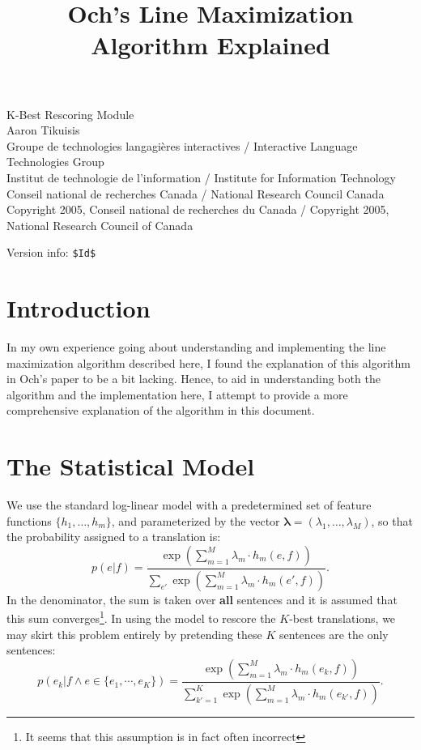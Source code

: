 \documentclass[12pt]{amsart}
\begin{document}
\title{Och's Line Maximization Algorithm Explained}
\maketitle

{\tiny
\noindent
K-Best Rescoring Module\\
Aaron Tikuisis\\
Groupe de technologies langagi{\`e}res interactives / Interactive Language Technologies Group\\
Institut de technologie de l'information / Institute for Information Technology\\
Conseil national de recherches Canada / National Research Council Canada\\
Copyright 2005, Conseil national de recherches du Canada / Copyright 2005, National Research Council of Canada
}

{\tiny
\noindent
Version info: \verb+$Id$+
}
\\

\section{Introduction\label{sec:intro}}
In my own experience going about understanding and implementing the line maximization algorithm described here, I found the explanation of this algorithm in Och's paper to be a bit lacking.
Hence, to aid in understanding both the algorithm and the implementation here, I attempt to provide a more comprehensive explanation of the algorithm in this document.

\section{The Statistical Model\label{sec:model}}
We use the standard log-linear model with a predetermined set of feature functions $\{h_1, \dots , h_m\}$, and parameterized by the vector $\boldsymbol{\lambda} = (\lambda_1, \dots , \lambda_M)$, so that the probability assigned to a translation is:
\[ p(e|f) = \frac
{\exp \left( \sum_{m=1}^M \lambda_m \cdot h_m(e,f) \right)}
{\sum_{e'} \exp \left( \sum_{m=1}^M \lambda_m \cdot h_m(e',f) \right)}. \]
In the denominator, the sum is taken over \textbf{all} sentences and it is assumed that this sum converges\footnote{It seems that this assumption is in fact often incorrect}.
In using the model to rescore the $K$-best translations, we may skirt this problem entirely by pretending these $K$ sentences are the only sentences:
\[ p(e_k|f \land e \in \{e_1, \cdots , e_K\}) = \frac
{\exp \left( \sum_{m=1}^M \lambda_m \cdot h_m(e_k,f) \right)}
{\sum_{k'=1}^K \exp \left( \sum_{m=1}^M \lambda_m \cdot h_m(e_{k'},f) \right)}. \]
\end{document}
